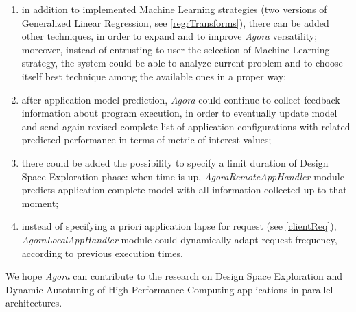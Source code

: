 \begin{enumerate}

	\item in addition to implemented Machine Learning strategies (two versions of Generalized Linear Regression, see \ref{regrTransforms}), there can be added other techniques, in order to expand and to improve \textit{Agora} versatility; moreover, instead of entrusting to user the selection of Machine Learning strategy, the system could be able to analyze current problem and to choose itself best technique among the available ones in a proper way;

	\item after application model prediction, \textit{Agora} could continue to collect feedback information about program execution, in order to eventually update model and send again revised complete list of application configurations with related predicted performance in terms of metric of interest values;

	\item there could be added the possibility to specify a limit duration of Design Space Exploration phase: when time is up, \textit{AgoraRemoteAppHandler} module predicts application complete model with all information collected up to that moment;

	\item instead of specifying a priori application lapse for request (see \ref{clientReq}), \textit{AgoraLocalAppHandler} module could dynamically a\-dapt request frequency, according to previous execution times.

\end{enumerate}

We hope \textit{Agora} can contribute to the research on Design Space Exploration and Dynamic Autotuning of High Performance Computing applications in parallel architectures.
